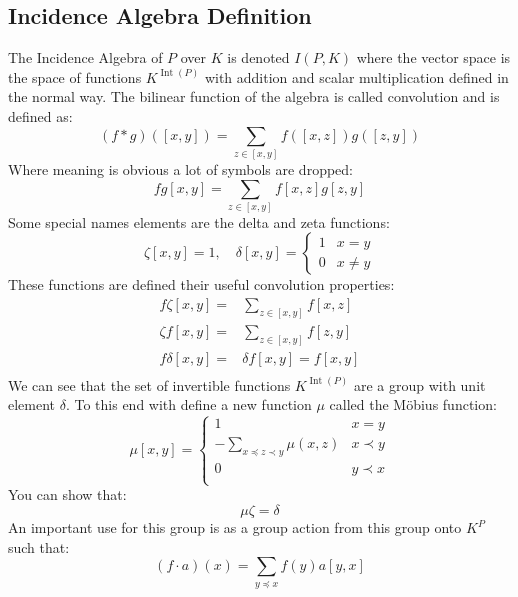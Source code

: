 \subsection{Incidence Algebra Definition}
The Incidence Algebra of $P$ over $K$ is denoted $I(P,K)$ where the vector space is the space of functions $K^{\operatorname{Int}(P)}$ with addition and scalar multiplication defined in the normal way.
The bilinear function of the algebra is called convolution and is defined as:
\[(f*g)([x,y]) = \sum_{z\in [x,y]}f([x,z])g([z,y])\]
Where meaning is obvious a lot of symbols are dropped:
\[fg[x,y] = \sum_{z\in [x,y]}f[x,z]g[z,y]\]
Some special names elements are the delta and zeta functions:
\[\zeta[x,y] = 1,\quad\delta[x,y] = \begin{cases}1&x=y\\0&x\neq y\end{cases}\]
These functions are defined their useful convolution properties:
\begin{equation*}
\begin{aligned}
	f\zeta[x,y] =& \sum_{z\in [x,y]}f[x,z]\\
	\zeta f[x,y] =& \sum_{z\in [x,y]}f[z,y]\\
	f\delta[x,y] =& \delta f[x,y] = f[x,y]\\
\end{aligned}
\end{equation*}
We can see that the set of invertible functions $K^{\operatorname{Int}(P)}$ are a group with unit element $\delta$.
To this end  with define a new function $\mu$ called the Möbius function:
\[\mu[x,y] = \begin{cases}1&x=y\\-\sum_{x\preceq z\prec y}\mu(x,z)&x\prec y\\0&y\prec x\\\end{cases}\]
You can show that:
\[\mu\zeta = \delta\]
An important use for this group is as a group action from this group onto $K^P$ such that:
\[(f\cdot a)(x) = \sum_{y\preceq x}f(y)a[y,x]\]

